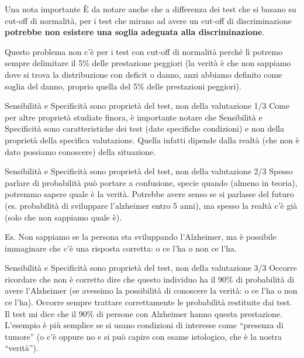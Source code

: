 \documentclass[
  ignorenonframetext,
  aspectratio=169,
]{beamer}
\begin{document}
\begin{frame}{Una nota importante}
\label{una-nota-importante}
È da notare anche che a differenza dei test che si basano su cut-off di
normalità, per i test che mirano ad avere un cut-off di discriminazione
\textbf{potrebbe non esistere una soglia adeguata alla discriminazione}.

Questo problema non c'è per i test con cut-off di normalità perché lì
potremo sempre delimitare il 5\% delle prestazione peggiori (la verità è
che non sappiamo dove si trova la distribuzione con deficit o danno,
anzi abbiamo definito come soglia del danno, proprio quella del 5\%
delle prestazioni peggiori).
\end{frame}

\begin{frame}{\small Sensibilità e Specificità sono proprietà del test,
non della valutazione 1/3}
\label{sensibilituxe0-e-specificituxe0-sono-proprietuxe0-del-test-non-della-valutazione-13}
Come per altre proprietà studiate finora, è importante notare che
Sensibilità e Specificità sono caratteristiche dei test (date specifiche
condizioni) e non della proprietà della specifica valutazione. Quella
infatti dipende dalla realtà (che non è dato possiamo conoscere) della
situazione.
\end{frame}

\begin{frame}{\small Sensibilità e Specificità sono proprietà del test,
non della valutazione 2/3}
\label{sensibilituxe0-e-specificituxe0-sono-proprietuxe0-del-test-non-della-valutazione-23}
Spesso parlare di probabilità può portare a confusione, specie quando
(almeno in teoria), potremmo sapere quale è la verità. Potrebbe avere
senso se si parlasse del futuro (es. probabilità di sviluppare
l'alzheimer entro 5 anni), ma spesso la realtà c'è già (solo che non
sappiamo quale è).

Es. Non sappiamo se la persona sta sviluppando l'Alzheimer, ma è
possibile immaginare che c'è una risposta corretta: o ce l'ha o non ce
l'ha.
\end{frame}

\begin{frame}{\small Sensibilità e Specificità sono proprietà del test,
non della valutazione 3/3}
\label{sensibilituxe0-e-specificituxe0-sono-proprietuxe0-del-test-non-della-valutazione-33}
Occorre ricordare che non è corretto dire che questo individuo ha il
90\% di probabilità di avere l'Alzheimer (se avessimo la possibilità di
conoscere la verità: o ce l'ha o non ce l'ha). Occorre sempre trattare
correttamente le probabilità restituite dai test. Il test mi dice che il
90\% di persone con Alzheimer hanno questa prestazione. L'esempio è più
semplice se si usano condizioni di interesse come ``presenza di tumore''
(o c'è oppure no e si può capire con esame istologico, che è la nostra
``verità'').
\end{frame}
\end{document}
